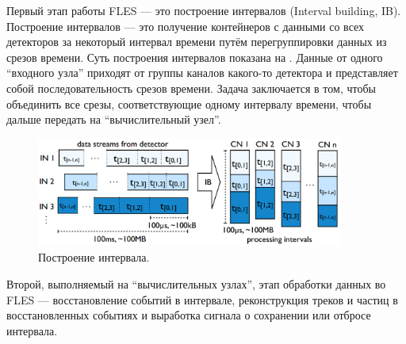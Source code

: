 Первый этап работы FLES --- это построение интервалов (Interval building, IB). Построение интервалов --- это получение контейнеров с данными со всех детекторов за некоторый интервал времени путём перегруппировки данных из срезов времени. Суть построения интервалов показана на . Данные от одного ``входного узла'' приходят от группы каналов какого-то детектора и представляет собой последовательность срезов времени. Задача заключается в том, чтобы объединить все срезы, соответствующие одному интервалу времени, чтобы дальше передать на ``вычислительный узел''.


\begin{figure}[H]
\centering
\includegraphics[width=0.9\textwidth]{pictures/Interval_building.png}
\caption{Построение интервала.}
\label{fig:IntervalBuilding}
\end{figure}

Второй, выполняемый на ``вычислительных узлах'', этап обработки данных во FLES --- восстановление событий в интервале, реконструкция треков и частиц в восстановленных событиях и выработка сигнала о сохранении или отбросе интервала.

